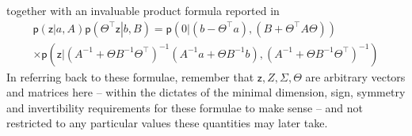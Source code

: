 \documentclass[preprint,12pt]{elsarticle}
\newcommand*{\M}[1]{\ensuremath{#1}\xspace}
\newcommand*{\tr}[1]{\M{#1}}
\newcommand*{\x}{\times}
\newcommand*{\rv}[1]{\mathsf{#1}}
\newcommand*{\prob}[3]{\M{\mathsf{p}\!\left(\left.{#1}\right\vert{#2,#3}\right)}}
\begin{document}
    \begin{equation} \label{eq:Notation:scaling}
    \end{equation}
    together with an invaluable product formula reported in \cite{Rasmussen2016}
    \begin{multline} \label{eq:Notation:product}
        \prob{\tr{\rv{z}}}{\tr{a}}{\tr{A}}\prob{\Theta^{\intercal}\tr{\rv{z}}}{\tr{b}}{\tr{B}}
        = \prob{\tr{0}}{(\tr{b}-\Theta^{\intercal}\tr{a})}{(\tr{B} + \Theta^{\intercal}\tr{A}\Theta)} \\
        \x \prob{\tr{\rv{z}}}
        {(\tr{A}^{-1}+\Theta\tr{B}^{-1}\Theta^{\intercal})^{-1}(\tr{A}^{-1}\tr{a}+\Theta\tr{B}^{-1}\tr{b})}
        {(\tr{A}^{-1}+\Theta\tr{B}^{-1}\Theta^{\intercal})^{-1}}
    \end{multline}
    In referring back to these formulae, remember that $\tr{\rv{z}}, \tr{Z}, \Sigma, \Theta$ are arbitrary vectors and matrices here -- within the dictates of the minimal dimension, sign, symmetry and invertibility requirements for these formulae to make sense -- and not restricted to any particular values these quantities may later take.
\end{document}
